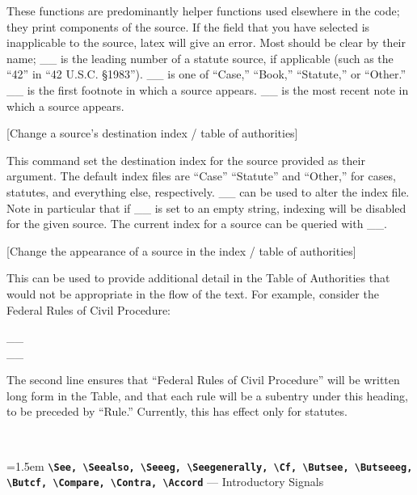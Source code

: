  \noindent These functions are predominantly helper functions used elsewhere in the code; they print components of the source. If the field
 that you have selected is inapplicable to the source, latex will give an error. Most should be clear by their name; _\Prefix_ is the 
 leading number of a statute source, if applicable (such as the ``42'' in ``42 U.S.C. \S 1983''). _\SrcType_ is one of ``Case,'' ``Book,'' 
 ``Statute,'' or ``Other.'' _\SupraNote_ is the first footnote in which a source appears. _\LastNote_ is the most recent note
 in which a source appears.


 [Change a source's destination index / table of authorities] 

 \noindent This command set the destination index for the source provided as their argument. The default index files are ``Case''
 ``Statute'' and ``Other,'' for cases, statutes, and everything else, respectively. _\SetIndexType_ can be used to alter the index file. 
 Note in particular that if _\SetIndexType_ is set to an empty string, indexing will be disabled for the given source. 
 The current index for a source can be queried with _\IndexType_. 


 [Change the appearance of a source in the index / table of authorities]

 \noindent This can be used to provide additional detail in the Table of Authorities that would not be appropriate in the flow of the text.
 For example, consider the Federal Rules of Civil Procedure:

 __ \\
 \hspace*{\parindent}__

 \noindent The second line ensures that ``Federal Rules of Civil Procedure'' will be written long form in the Table, and that each rule will
 be a subentry under this heading, to be preceded by ``Rule.'' Currently, this has effect only for statutes.


~\par

\noindent
\begingroup\raggedright{}\hangindent=1.5em
\texttt{\bf \textbackslash{}See, \textbackslash{}Seealso, \textbackslash{}Seeeg, \textbackslash{}Seegenerally, \textbackslash{}Cf, \textbackslash{}Butsee, \textbackslash{}Butseeeg, \textbackslash{}Butcf, \textbackslash{}Compare, \textbackslash{}Contra, \textbackslash{}Accord} --- Introductory Signals 
\endgroup

